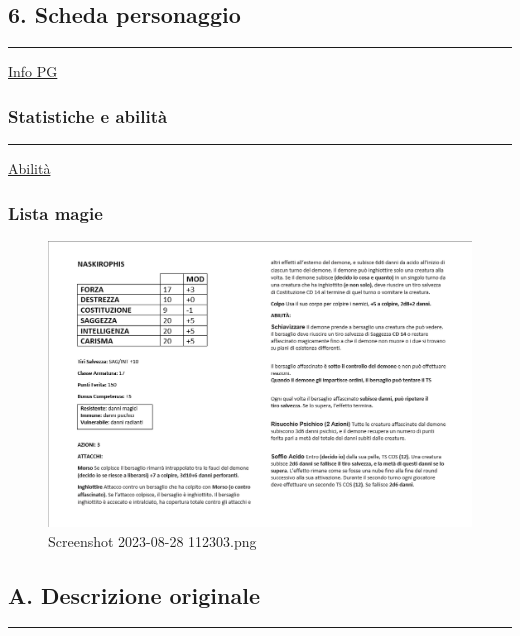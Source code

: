 \subsection{6. Scheda personaggio}\label{scheda-personaggio}

\begin{center}\rule{0.5\linewidth}{0.5pt}\end{center}

\href{Info\%20PG\%204d827ff2807f4020b43bdae278238fa1.csv}{Info PG}

\subsubsection{Statistiche e abilità}\label{statistiche-e-abilituxe0}

\begin{center}\rule{0.5\linewidth}{0.5pt}\end{center}

\href{Abilita\%CC\%80\%20da1538d735de4e138ef5740acbc7e0a6.csv}{Abilità}

\subsubsection{Lista magie}\label{lista-magie}

\begin{figure}
\centering
\includegraphics{Screenshot_2023-08-28_112303.png}
\caption{Screenshot 2023-08-28 112303.png}
\end{figure}

\subsection{A. Descrizione originale}\label{a.-descrizione-originale}

\begin{center}\rule{0.5\linewidth}{0.5pt}\end{center}

